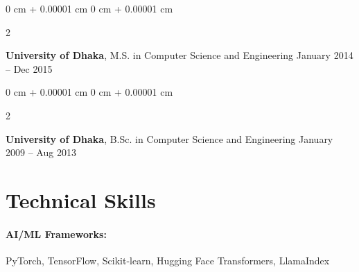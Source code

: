 \documentclass[10pt, letterpaper]{article}
\newenvironment{highlights}{
    \begin{itemize}[
        topsep=0.10 cm,
        parsep=0.10 cm,
        partopsep=0pt,
        itemsep=0pt,
        leftmargin=0 cm + 10pt
    ]
}{
    \end{itemize}
} %
\newenvironment{onecolentry}{
    \begin{adjustwidth}{
        0 cm + 0.00001 cm
    }{
        0 cm + 0.00001 cm
    }
}{
    \end{adjustwidth}
} %
\newenvironment{twocolentry}[2][]{
    \onecolentry
    \def\secondColumn{#2}
    \setcolumnwidth{\fill, 4.5 cm}
    \begin{paracol}{2}
}{
    \switchcolumn \raggedleft \secondColumn
    \end{paracol}
    \endonecolentry
} %
\begin{document}
        \begin{twocolentry}{
            January 2014 – Dec 2015
        }
            \textbf{University of Dhaka}, M.S. in Computer Science and Engineering\end{twocolentry}


        \begin{twocolentry}{
            January 2009 – Aug 2013
        }
            \textbf{University of Dhaka}, B.Sc. in Computer Science and Engineering\end{twocolentry}
    
        




\vspace{-1.5mm}
\section{Technical Skills}

        \paragraph{AI/ML Frameworks:} PyTorch, TensorFlow, Scikit-learn, Hugging Face Transformers, LlamaIndex
        \vspace{-4mm}
\end{document}
